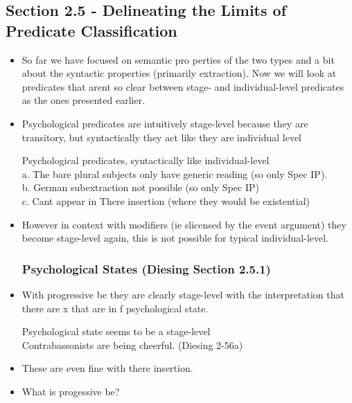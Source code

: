\documentclass[landscape]{article}
\begin{document}
\subsection*{Section 2.5 - Delineating the Limits of Predicate Classification}

\begin{itemize}
\item So far we have focused on semantic pro	perties of the two types and a bit about the syntactic properties (primarily extraction). Now we will look at predicates that arent so clear between stage- and individual-level predicates as the ones presented earlier.

\item Psychological predicates are intuitively stage-level because they are transitory, but syntactically they act like they are individual level

\begin{example}Psychological predicates, syntactically like individual-level\\
a. The bare plural subjects only have generic reading (so only Spec IP).\\
b. German  subextraction not possible (so only Spec IP)\\
c. Cant appear in There insertion (where they would be existential)
\end{example}

\item However in context with modifiers (ie slicensed by the event argument) they become stage-level again, this is not possible for typical individual-level.

\subsubsection*{Psychological States (Diesing Section 2.5.1)}

\item With progressive be they are clearly stage-level with the interpretation that there are x that are in f psychological state.
\begin{example}Psychological state seems to be a stage-level\\
 Contrabassonists are being cheerful. (Diesing 2-56a)
\end{example}

\item These are even fine with there insertion.

\item What is progessive be?


\end{itemize}
\end{document}
